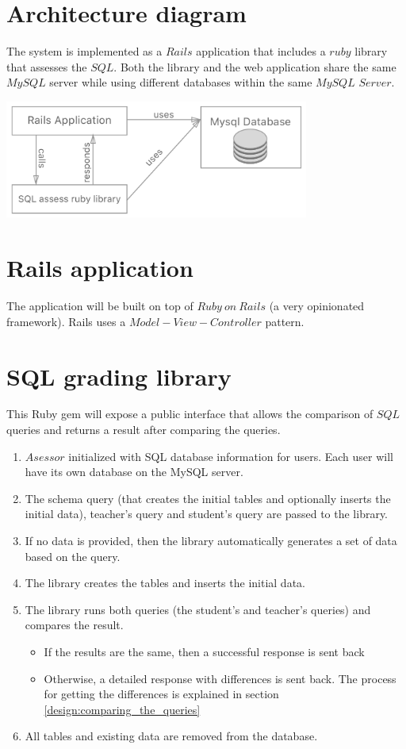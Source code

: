 \section{Architecture diagram}
The system is implemented as a $Rails$ application that includes a $ruby$ library
that assesses the $SQL$. Both the library and the web application share
the same $MySQL$ server while using different databases within the same $MySQL$
$Server$.
\begin{center}
    \includegraphics[width=100mm]{images/design/arhitecture.png}
\end{center}

\section{Rails application}
The application will be built on top of $Ruby\ on\ Rails$ (a very opinionated
framework). Rails uses a $Model-View-Controller$ pattern.

\section{SQL grading library}
This Ruby gem will expose a public interface that allows the
comparison of $SQL$ queries and returns a result after comparing the queries.
\begin{enumerate}
    \item $Asessor$ initialized with SQL database information for users. Each user
    will have its own database on the MySQL server.
    \item The schema query (that creates the initial tables and optionally inserts the
    initial data), teacher's query and student's query are passed to the library.
    \item If no data is provided, then the library automatically generates a set
    of data based on the query.
    \item The library creates the tables and inserts the initial data.
    \item The library runs both queries (the student's and teacher's queries)
    and compares the result.
    \begin{itemize}
        \item If the results are the same, then a successful response is sent back
        \item Otherwise, a detailed response with differences is sent back. The process
        for getting the differences is explained in section \ref{design:comparing_the_queries}
    \end{itemize}
    \item All tables and existing data are removed from the database.
\end{enumerate}

